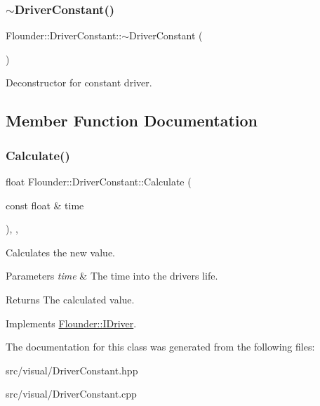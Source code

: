 \subsubsection{\texorpdfstring{$\sim$\+Driver\+Constant()}{~DriverConstant()}}
{\footnotesize\ttfamily Flounder\+::\+Driver\+Constant\+::$\sim$\+Driver\+Constant (\begin{DoxyParamCaption}{ }\end{DoxyParamCaption})}



Deconstructor for constant driver. 



\subsection{Member Function Documentation}
\mbox{\label{class_flounder_1_1_driver_constant_acdad6e0184d414f0e3d60f645c2d472d}} 
\subsubsection{\texorpdfstring{Calculate()}{Calculate()}}
{\footnotesize\ttfamily float Flounder\+::\+Driver\+Constant\+::\+Calculate (\begin{DoxyParamCaption}\item[{const float \&}]{time }\end{DoxyParamCaption})\hspace{0.3cm}{\ttfamily [override]}, {\ttfamily [protected]}, {\ttfamily [virtual]}}



Calculates the new value. 


\begin{DoxyParams}{Parameters}
{\em time} & The time into the drivers life. \\
\hline
\end{DoxyParams}
\begin{DoxyReturn}{Returns}
The calculated value. 
\end{DoxyReturn}


Implements \hyperlink{class_flounder_1_1_i_driver_a969f0c8da089f9d17129ee12b40c354a}{Flounder\+::\+I\+Driver}.



The documentation for this class was generated from the following files\+:\begin{DoxyCompactItemize}
\item 
src/visual/Driver\+Constant.\+hpp\item 
src/visual/Driver\+Constant.\+cpp\end{DoxyCompactItemize}
